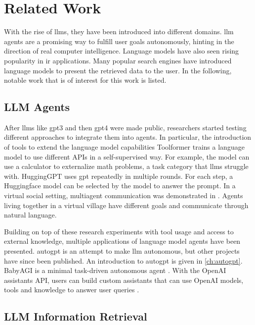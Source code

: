 \documentclass[../main.tex]{subfiles}
\begin{document}

\section{Related Work}

With the rise of \glspl{llm}, they have been introduced into different domains.
\Gls{llm} agents are a promising way to fulfill user goals autonomously,
hinting in the direction of real computer intelligence.
Language models have also seen rising popularity in \gls{ir} applications.
Many popular search engines have introduced language models to present the retrieved data to the user.
In the following, notable work that is of interest for this work is listed.

\subsection{LLM Agents}

After \glspl{llm} like \gls{gpt3} and then \gls{gpt4} were made public,
researchers started testing different approaches to integrate them into agents.
In particular, the introduction of tools to extend the language model capabilities
Toolformer \cite{Schick2023} trains a language model to use different APIs in a self-supervised way.
For example, the model can use a calculator to externalize math problems,
a task category that \glspl{llm} struggle with.
HuggingGPT \cite{Shen2023} uses \gls{gpt} repeatedly in multiple rounds.
For each step, a Huggingface model can be selected by the model to answer the prompt.
In a virtual social setting, multiagent communication was demonstrated in \autocite{Park2023}.
Agents living together in a virtual village have different goals and communicate through natural language.

Building on top of these research experiments with tool usage and access to external knowledge,
multiple applications of language model agents have been presented.
\gls{autogpt} \cite{SignificantGravitas2023} is an attempt to make \gls{llm} autonomous,
but other projects have since been published.
An introduction to \gls{autogpt} is given in \autoref{ch:autogpt}.
BabyAGI is a minimal task-driven autonomous agent \cite{Nakajima2023}.
With the OpenAI assistants API,
users can build custom assistants
that can use OpenAI models, tools and knowledge to answer user queries \cite{zotero-195}.

\subsection{LLM Information Retrieval}
\end{document}

